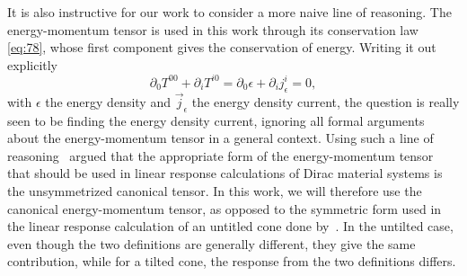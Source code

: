 It is also instructive for our work to consider a more naive line of reasoning.
The energy-momentum tensor is used in this work through its conservation law \cref{eq:78}, whose first component gives the conservation of energy.
Writing it out explicitly
\begin{equation}
  \label{eq:84}
  \partial_0T^{00} + \partial_i T^{i0} = \partial_0 \epsilon + \partial_i j^i_{\epsilon} = 0,
\end{equation}
with \( \epsilon \) the energy density and \( \vec{j}_{\epsilon} \) the energy density current, the question is really seen to be finding the energy density current, ignoring all formal arguments about the energy-momentum tensor in a general context.
Using such a line of reasoning~\textcite{vanderwurffMagnetovorticalThermoelectricTransport2019} argued that the appropriate form of the energy-momentum tensor that should be used in linear response calculations of Dirac material systems is the unsymmetrized canonical tensor.
In this work, we will therefore use the canonical energy-momentum tensor, as opposed to the symmetric form used in the linear response calculation of an untitled cone done by~\textcite{arjonaFingerprintsConformalAnomaly2019}.
In the untilted case, even though the two definitions are generally different, they give the same contribution, while for a tilted cone, the response from the two definitions differs.

